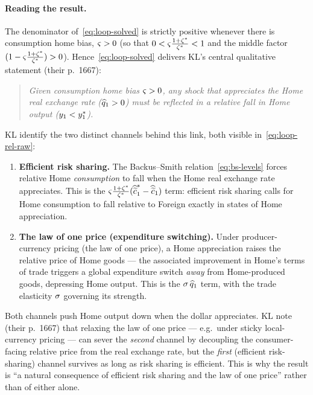 \paragraph{Reading the result.} The denominator of~\eqref{eq:loop-solved} is
strictly positive whenever there is consumption home bias, $\varsigma>0$ (so that
$0<\varsigma\frac{1+\zeta^{*}}{\zeta^{*}}<1$ and the middle factor
$(1-\varsigma\frac{1+\zeta^{*}}{\zeta^{*}})>0$). Hence~\eqref{eq:loop-solved} delivers KL's
central qualitative statement (their p.~1667):
\begin{quote}
\emph{Given consumption home bias $\varsigma>0$, any shock that appreciates the Home
real exchange rate ($\widehat{q}_1>0$) must be reflected in a relative fall in
Home output ($y_1<y^{*}_1$).}
\end{quote}
KL identify the two distinct channels behind this link, both visible
in~\eqref{eq:loop-rel-raw}:
\begin{enumerate}[leftmargin=1.8em,itemsep=3pt]
  \item \textbf{Efficient risk sharing.} The Backus--Smith
  relation~\eqref{eq:bs-levels} forces relative Home \emph{consumption} to fall
  when the Home real exchange rate appreciates. This is the
  $\varsigma\frac{1+\zeta^{*}}{\zeta^{*}}(\widehat{\widetilde{c}}^{*}_1-\widehat{\widetilde{c}}_1)$ term: efficient
  risk sharing calls for Home consumption to fall relative to Foreign exactly in
  states of Home appreciation.
  \item \textbf{The law of one price (expenditure switching).} Under
  producer-currency pricing (the law of one price), a Home appreciation raises the
  relative price of Home goods --- the associated improvement in Home's terms of
  trade triggers a global expenditure switch \emph{away} from Home-produced goods,
  depressing Home output. This is the $\sigma\,\widehat{q}_1$ term, with the trade
  elasticity $\sigma$ governing its strength.
\end{enumerate}
Both channels push Home output down when the dollar appreciates. KL note (their
p.~1667) that relaxing the law of one price --- e.g.\ under sticky local-currency
pricing --- can sever the \emph{second} channel by decoupling the consumer-facing
relative price from the real exchange rate, but the \emph{first} (efficient
risk-sharing) channel survives as long as risk sharing is efficient. This is why
the result is ``a natural consequence of efficient risk sharing and the law of
one price'' rather than of either alone.

